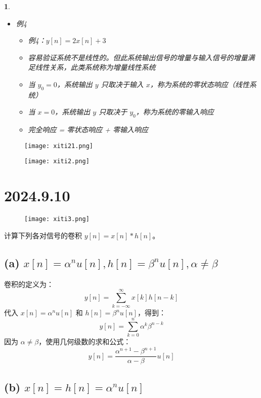 \documentclass[UTF8]{report}
\theoremstyle{MyLineTheoremStyle} %
\theoremstyle{MyBlockTheoremStyle} %
\theoremstyle{MySubsubsectionStyle} %
\newtheorem{definition}{}
\begin{document}
\begin{definition}
\begin{itemize}
        \item 例4
        \begin{itemize}
            \item 例4：$y[n] = 2x[n] + 3$
            \item 容易验证系统不是线性的。但此系统输出信号的增量与输入信号的增量满足线性关系，此类系统称为增量线性系统
            \item 当 $y_0 = 0$，系统输出 $y$ 只取决于输入 $x$，称为系统的零状态响应（线性系统）
            \item 当 $x = 0$，系统输出 $y$ 只取决于 $y_0$，称为系统的零输入响应
            \item 完全响应 = 零状态响应 + 零输入响应
        \end{itemize}
    \end{itemize}
\end{definition}

\begin{figure}[ht]
    \centering
    \texttt{[image: xiti21.png]}
\end{figure}

\begin{figure}[ht]
    \centering
    \texttt{[image: xiti2.png]}
\end{figure}




\chapter{2024.9.10}\thispagestyle{fancy}

\begin{figure}[ht]
    \centering
    \texttt{[image: xiti3.png]}
\end{figure}

计算下列各对信号的卷积 $y[n] = x[n] \ast h[n]$。

\section*{(a) $x[n] = \alpha^n u[n], h[n] = \beta^n u[n], \alpha \neq \beta$}

卷积的定义为：
\[
y[n] = \sum_{k=-\infty}^{\infty} x[k] h[n-k]
\]
代入 $x[n] = \alpha^n u[n]$ 和 $h[n] = \beta^n u[n]$，得到：
\[
y[n] = \sum_{k=0}^{n} \alpha^k \beta^{n-k}
\]
因为 $\alpha \neq \beta$，使用几何级数的求和公式：
\[
y[n] = \frac{\alpha^{n+1} - \beta^{n+1}}{\alpha - \beta} u[n]
\]

\section*{(b) $x[n] = h[n] = \alpha^n u[n]$}
\end{document}
